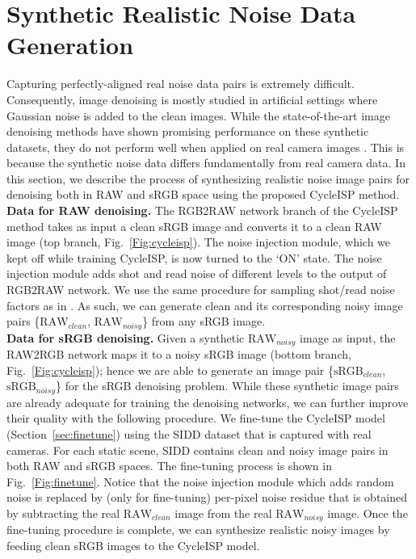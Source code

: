 \documentclass[10pt,twocolumn,letterpaper]{article}
\begin{document}
\section{Synthetic Realistic Noise Data Generation}
\label{sec:finetune noisy}
Capturing perfectly-aligned real noise data pairs 
is extremely difficult. 
Consequently, image denoising is mostly studied in artificial settings where Gaussian noise is added to the clean images. 
While the state-of-the-art image denoising methods \cite{MLP,DnCNN} have shown promising performance on these synthetic datasets, they do not perform well when applied on real camera images \cite{sidd,dnd}. 
This is because the synthetic noise data differs fundamentally from real camera data. 
In this section, we describe the process of synthesizing realistic noise image pairs for denoising both in RAW and sRGB space using the proposed CycleISP method. 
\vspace{0.4em}\\
\noindent \textbf{Data for RAW denoising.}
The RGB2RAW network branch of the CycleISP method takes as input a clean sRGB image and converts it to a clean RAW image (top branch, Fig.~\ref{Fig:cycleisp}). 
The noise injection module, which we kept off while training CycleISP, is now turned to the `ON' state. 
The noise injection module adds shot and read noise of different levels to the output of RGB2RAW network. 
We use the same procedure for sampling shot/read noise factors as in \cite{Brooks2019}. 
As such,  we can generate clean and its corresponding noisy image pairs \{$\text{RAW}_{clean}$, $\text{RAW}_{noisy}$\} from any sRGB image.   
\vspace{0.4em}\\
\noindent \textbf{Data for sRGB denoising.}
Given a synthetic $\text{RAW}_{noisy}$ image as input, the RAW2RGB network maps it to a noisy sRGB image (bottom branch, Fig.~\ref{Fig:cycleisp}); hence we are able to generate an image pair \{$\text{sRGB}_{clean}$,$\text{sRGB}_{noisy}$\} for the sRGB denoising problem. 
While these synthetic image pairs are already adequate for training the denoising networks, we can further improve their quality with the following procedure. 
We fine-tune the CycleISP model (Section~\ref{sec:finetune}) using the SIDD dataset \cite{sidd} that is captured with real cameras. 
For each static scene, SIDD contains clean and noisy image pairs in both RAW and sRGB spaces.  
The fine-tuning process is shown in Fig.~\ref{Fig:finetune}. 
Notice that the noise injection module which adds random noise is replaced by (only for fine-tuning) per-pixel noise residue that is obtained by subtracting the real $\text{RAW}_{clean}$ image from the real $\text{RAW}_{noisy}$ image. 
Once the fine-tuning procedure is complete, we can synthesize realistic noisy images by feeding clean sRGB images to the CycleISP model.
\end{document}
